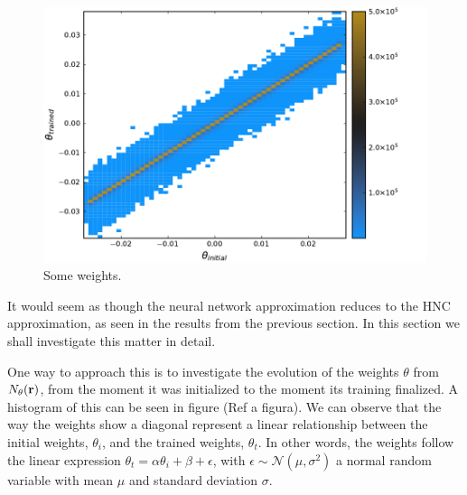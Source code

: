\begin{figure}
    \includegraphics[width=\textwidth]{figuras/capitulo-3/weights_phi=0.45.pdf}
    \caption[Comparison between weights, $\phi=0.45$.]{Some weights.}
    \label{fig:pesos45}
\end{figure}

It would seem as though the neural network approximation reduces to the HNC
approximation, as seen in the results from the previous section. In this section
we shall investigate this matter in detail.

One way to approach this is to investigate the evolution of the weights $\theta$ from
$N_{\theta}(\mathbf{r})$, from the moment it was initialized to the moment its training finalized.
A histogram of this can be seen in figure (Ref a figura). We can observe that the way
the weights show a diagonal represent a linear relationship between the initial
weights, $\theta_{i}$, and the trained weights, $\theta_{t}$. In other words,
the weights follow the linear expression
$\theta_{t} = \alpha \theta_{i} + \beta + \epsilon$, with
$\epsilon \sim \mathcal{N}(\mu, \sigma^{2})$ a normal random variable with mean
$\mu$ and standard deviation $\sigma$.
